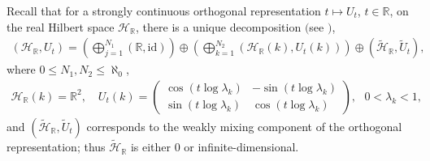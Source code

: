 \documentclass[12pt, a4paper,reqno]{amsart}
\theoremstyle{definition}
\renewcommand{\leq}{\leqslant}
\def\R{\mathbb R}
\newcommand{\CH}{\mathcal{H}}
\begin{document}
Recall that for a  strongly continuous orthogonal representation $t\mapsto U_t$, $t\in \R$,  on the real Hilbert space $\CH_\R$, there is a unique decomposition $($see \cite{Shlyakhtenko}$)$,
\begin{align*}%
( \CH_\R, U_t)  =  \left(\bigoplus_{j = 1}^{N_1} (\R, \text{id} )\right) \oplus \left( \bigoplus_{k=1}^{N_2}(\CH_\R(k), U_t(k) ) \right) \oplus (\widetilde{\CH}_\R, \widetilde{U}_t),
\end{align*}
where $0\leq N_1,N_2\leq \aleph_0$, 
\begin{align*}
\CH_\R(k) = \R^2, \quad U_t(k)  = \left( \begin{matrix} \cos( t\log \lambda_k)& - \sin( t\log\lambda_k) \\
\sin( t\log\lambda_k)& \cos( t\log\lambda_k)  \end{matrix} \right), \text{ }0<\lambda_k < 1,
\end{align*}
and $(\widetilde{\CH}_\R, \widetilde{U}_t)$ corresponds to the weakly mixing component of the orthogonal representation; thus $\widetilde{\CH}_\R$ is either $0$ or infinite-dimensional. 
\end{document}
